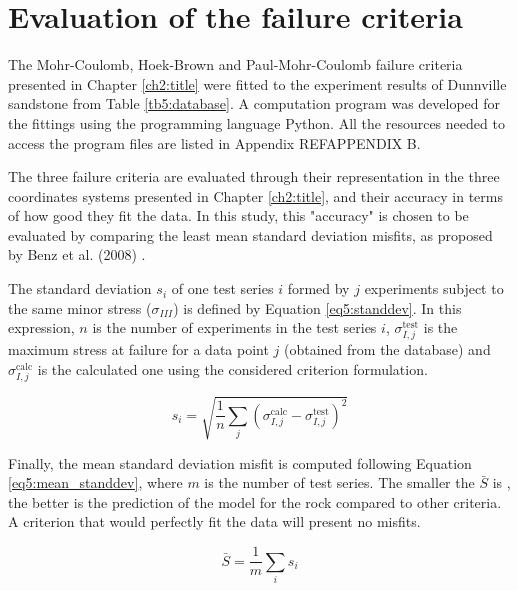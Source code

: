 \section{Evaluation of the failure criteria}\label{ch5:evaluation}

The Mohr-Coulomb, Hoek-Brown and Paul-Mohr-Coulomb failure criteria presented in Chapter \ref{ch2:title} were fitted to the experiment results of Dunnville sandstone from Table \ref{tb5:database}. A computation program was developed for the fittings using the programming language Python. All the resources needed to access the program files are listed in Appendix REF{APPENDIX B}. 

The three failure criteria are evaluated through their representation in the three coordinates systems presented in Chapter \ref{ch2:title}, and their accuracy in terms of how good they fit the data. In this study, this "accuracy" is chosen to be evaluated by comparing the least mean standard deviation misfits, as proposed by Benz et al. (2008) \cite{Benz2008}. 

The standard deviation $s_{i}$ of one test series $i$ formed by $j$ experiments subject to the same minor stress ($\sigma_{III}$) is defined by Equation \ref{eq5:standdev}. In this expression, $n$ is the number of experiments in the test series $i$, $\sigma_{I,j}^{\mathrm{test}}$ is the maximum stress at failure for a data point $j$ (obtained from the database) and $\sigma_{I,j}^{\mathrm{calc}}$ is the calculated one using the considered criterion formulation. 

\begin{equation}\label{eq5:standdev}
    s_{i}=\sqrt{\frac{1}{n} \sum_{j}\left(\sigma_{I,j}^{\mathrm{calc}}-\sigma_{I,j}^{\mathrm{test}}\right)^{2}}
\end{equation}

Finally, the mean standard deviation misfit is computed following Equation \ref{eq5:mean_standdev}, where $m$ is the number of test series. The smaller the $\bar{S}$ is , the better is the prediction of the model for the rock compared to other criteria. A criterion that would perfectly fit the data will present no misfits. 

\begin{equation}\label{eq5:mean_standdev}
    \bar{S}=\frac{1}{m} \sum_{i} s_{i}
\end{equation}


